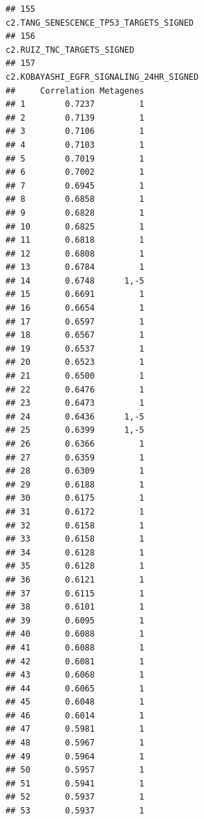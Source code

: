 \documentclass{article}\usepackage[]{graphicx}\usepackage[]{color}
\makeatletter
\newenvironment{kframe}{%
 \def\at@end@of@kframe{}%
 \ifinner\ifhmode%
  \def\at@end@of@kframe{\end{minipage}}%
  \begin{minipage}{\columnwidth}%
 \fi\fi%
 \def\FrameCommand##1{\hskip\@totalleftmargin \hskip-\fboxsep
 \colorbox{shadecolor}{##1}\hskip-\fboxsep
     \hskip-\linewidth \hskip-\@totalleftmargin \hskip\columnwidth}%
 \MakeFramed {\advance\hsize-\width
   \@totalleftmargin\z@ \linewidth\hsize
   \@setminipage}}%
 {\par\unskip\endMakeFramed%
 \at@end@of@kframe}
\newenvironment{knitrout}{}{} %
\makeatother
\begin{document}
\begin{knitrout}
\begin{kframe}
\begin{verbatim}
## 155                                                                                                                                                                                                                                                                                                                c2.TANG_SENESCENCE_TP53_TARGETS_SIGNED
## 156                                                                                                                                                                                                                                                                                                                            c2.RUIZ_TNC_TARGETS_SIGNED
## 157                                                                                                                                                                                                                                                                                                               c2.KOBAYASHI_EGFR_SIGNALING_24HR_SIGNED
##     Correlation Metagenes
## 1        0.7237         1
## 2        0.7139         1
## 3        0.7106         1
## 4        0.7103         1
## 5        0.7019         1
## 6        0.7002         1
## 7        0.6945         1
## 8        0.6858         1
## 9        0.6828         1
## 10       0.6825         1
## 11       0.6818         1
## 12       0.6808         1
## 13       0.6784         1
## 14       0.6748      1,-5
## 15       0.6691         1
## 16       0.6654         1
## 17       0.6597         1
## 18       0.6567         1
## 19       0.6537         1
## 20       0.6523         1
## 21       0.6500         1
## 22       0.6476         1
## 23       0.6473         1
## 24       0.6436      1,-5
## 25       0.6399      1,-5
## 26       0.6366         1
## 27       0.6359         1
## 28       0.6309         1
## 29       0.6188         1
## 30       0.6175         1
## 31       0.6172         1
## 32       0.6158         1
## 33       0.6158         1
## 34       0.6128         1
## 35       0.6128         1
## 36       0.6121         1
## 37       0.6115         1
## 38       0.6101         1
## 39       0.6095         1
## 40       0.6088         1
## 41       0.6088         1
## 42       0.6081         1
## 43       0.6068         1
## 44       0.6065         1
## 45       0.6048         1
## 46       0.6014         1
## 47       0.5981         1
## 48       0.5967         1
## 49       0.5964         1
## 50       0.5957         1
## 51       0.5941         1
## 52       0.5937         1
## 53       0.5937         1

\end{verbatim}
\end{kframe}
\end{knitrout}
\end{document}
